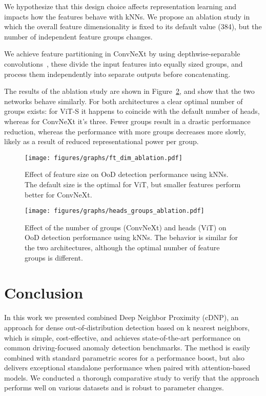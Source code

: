 \documentclass[10pt,twocolumn,letterpaper]{article}
\begin{document}
We hypothesize that this design choice affects representation learning and impacts how the features behave with kNNs. We propose an ablation study in which the overall feature dimensionality is fixed to its default value (384), but the number of independent feature groups changes.

We achieve feature partitioning in ConvNeXt by using depthwise-separable convolutions~\cite{Chollet_2017_CVPR}, these divide the input features into equally sized groups, and process them independently into separate outputs before concatenating.

The results of the ablation study are shown in Figure~\ref{fig:groups_heads_ablation}, and show that the two networks behave similarly. For both architectures a clear optimal number of groups exists: for ViT-S it happens to coincide with the default number of heads, whereas for ConvNeXt it's three. Fewer groups result in a drastic performance reduction, whereas the performance with more groups decreases more slowly, likely as a result of reduced representational power per group.





\begin{figure}
    \centering
    \texttt{[image: figures/graphs/ft\_dim\_ablation.pdf]}
    \caption{Effect of feature size on OoD detection performance using kNNs. The default size is the optimal for ViT, but smaller features perform better for ConvNeXt.}
    \label{fig:ft_size_ablation}
\end{figure}

\begin{figure}
    \centering
    \texttt{[image: figures/graphs/heads\_groups\_ablation.pdf]}
    \caption{Effect of the number of groups (ConvNeXt) and heads (ViT) on OoD detection performance using kNNs. The behavior is similar for the two architectures, although the optimal number of feature groups is different.}
    \label{fig:groups_heads_ablation}
\end{figure}
 \section{Conclusion}

In this work we presented combined Deep Neighbor Proximity (cDNP), an approach for dense out-of-distribution detection based on k nearest neighbors, which is simple, cost-effective, and achieves state-of-the-art performance on common driving-focused anomaly detection benchmarks.
The method is easily combined with standard parametric scores for a performance boost, but also delivers exceptional standalone performance when paired with attention-based models.
We conducted a thorough comparative study to verify that the approach performs well on various datasets and is robust to parameter changes.
\end{document}
